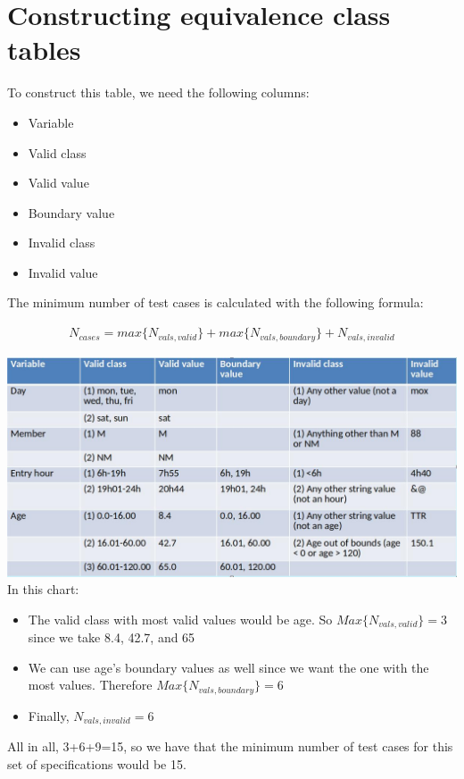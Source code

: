 \documentclass[12pt]{book}
\begin{document}
\chapter{Constructing equivalence class tables}
To construct this table, we need the following columns:

\begin{itemize}
    \item Variable
    \item Valid class
    \item Valid value
    \item Boundary value
    \item Invalid class
    \item Invalid value
\end{itemize}

The minimum number of test cases is calculated with the following formula:

\begin{align*}
    N_{cases}=max\{N_{vals,valid}\}+max\{N_{vals,boundary}\} + N_{vals,invalid}
\end{align*}

\includegraphics*[scale=0.4]{images/equivtable.jpg}
In this chart:

\begin{itemize}
    \item The valid class with most valid values would be age. So $Max\{N_{vals,valid}\}=3$ since we take 8.4, 42.7, and 65
    \item We can use age's boundary values as well since we want the one with the most values. Therefore $Max\{N_{vals,boundary}\}=6$
    \item Finally, $N_{vals,invalid}=6$
\end{itemize}

All in all, 3+6+9=15, so we have that the minimum number of test cases for this set of specifications would be 15.
\end{document}
